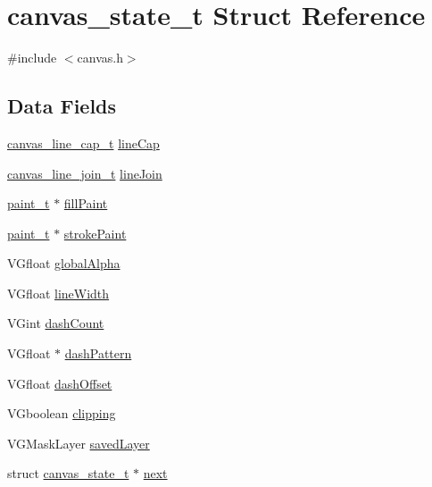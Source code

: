 \hypertarget{structcanvas__state__t}{}\section{canvas\+\_\+state\+\_\+t Struct Reference}
\label{structcanvas__state__t}


{\ttfamily \#include $<$canvas.\+h$>$}

\subsection*{Data Fields}
\begin{DoxyCompactItemize}
\item 
\hyperlink{canvas_8h_a6f28313f30bb2c28992e9e35a89d5f37}{canvas\+\_\+line\+\_\+cap\+\_\+t} \hyperlink{structcanvas__state__t_ab8a525903afc565a43bc8a0dfe75b866}{line\+Cap}
\item 
\hyperlink{canvas_8h_a565fe2807948893e6f97695409abd0b0}{canvas\+\_\+line\+\_\+join\+\_\+t} \hyperlink{structcanvas__state__t_adf0f976e5ae4b1b864216b96e9b4aafd}{line\+Join}
\item 
\hyperlink{structpaint__t}{paint\+\_\+t} $\ast$ \hyperlink{structcanvas__state__t_a137050e1598f0c76a76e1ce42a09f0c3}{fill\+Paint}
\item 
\hyperlink{structpaint__t}{paint\+\_\+t} $\ast$ \hyperlink{structcanvas__state__t_a0c8736008fd042235f9347563ff7b998}{stroke\+Paint}
\item 
V\+Gfloat \hyperlink{structcanvas__state__t_a95d523b1df5a121a83039f320d456328}{global\+Alpha}
\item 
V\+Gfloat \hyperlink{structcanvas__state__t_a96a2ac5de66c17fa2c411d38543ff310}{line\+Width}
\item 
V\+Gint \hyperlink{structcanvas__state__t_af816a480213b5d7fcab1b53204c4a4d5}{dash\+Count}
\item 
V\+Gfloat $\ast$ \hyperlink{structcanvas__state__t_a853b1185b6a5f5066aab0442cebfad4d}{dash\+Pattern}
\item 
V\+Gfloat \hyperlink{structcanvas__state__t_af97cf4ada992ba2eeff89ded6974b94b}{dash\+Offset}
\item 
V\+Gboolean \hyperlink{structcanvas__state__t_aeed448020ed8ed0206c897522ea62f29}{clipping}
\item 
V\+G\+Mask\+Layer \hyperlink{structcanvas__state__t_a46394e3d2c0bfac283b820478a8e54e6}{saved\+Layer}
\item 
struct \hyperlink{structcanvas__state__t}{canvas\+\_\+state\+\_\+t} $\ast$ \hyperlink{structcanvas__state__t_affd976ea64b3c8ac9ee660b20e8be5a9}{next}
\end{DoxyCompactItemize}


